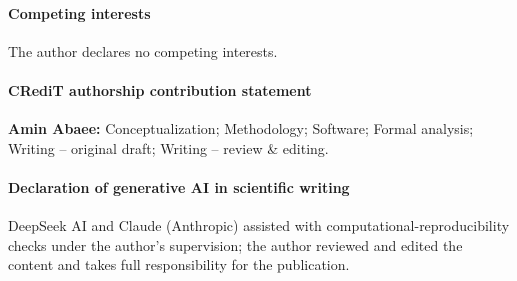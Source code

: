 \documentclass[preprint,12pt,authoryear]{elsarticle}
\begin{document}
\paragraph{Competing interests} The author declares no competing interests.

\paragraph{CRediT authorship contribution statement} \textbf{Amin Abaee:} Conceptualization; Methodology; Software; Formal analysis; Writing -- original draft; Writing -- review \& editing.

\paragraph{Declaration of generative AI in scientific writing} DeepSeek AI and Claude (Anthropic) assisted with computational-reproducibility checks under the author's supervision; the author reviewed and edited the content and takes full responsibility for the publication.
\end{document}
